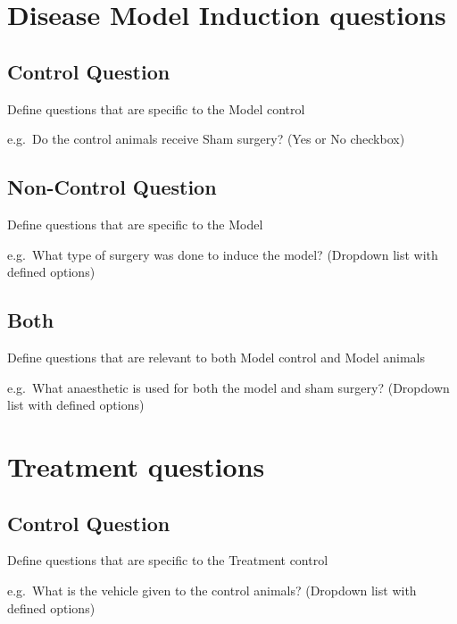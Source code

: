 \documentclass[
]{book}
\begin{document}
\hypertarget{disease-model-induction-questions}{%
\section{Disease Model Induction questions}\label{disease-model-induction-questions}}

\hypertarget{control-question}{%
\subsection{Control Question}\label{control-question}}

Define questions that are specific to the Model control

e.g.~Do the control animals receive Sham surgery?
(Yes or No checkbox)

\hypertarget{non-control-question}{%
\subsection{Non-Control Question}\label{non-control-question}}

Define questions that are specific to the Model

e.g.~What type of surgery was done to induce the model?
(Dropdown list with defined options)

\hypertarget{both}{%
\subsection{Both}\label{both}}

Define questions that are relevant to both Model control and Model animals

e.g.~What anaesthetic is used for both the model and sham surgery?
(Dropdown list with defined options)

\hypertarget{treatment-questions}{%
\section{Treatment questions}\label{treatment-questions}}

\hypertarget{control-question-1}{%
\subsection{Control Question}\label{control-question-1}}

Define questions that are specific to the Treatment control

e.g.~What is the vehicle given to the control animals?
(Dropdown list with defined options)
\end{document}
